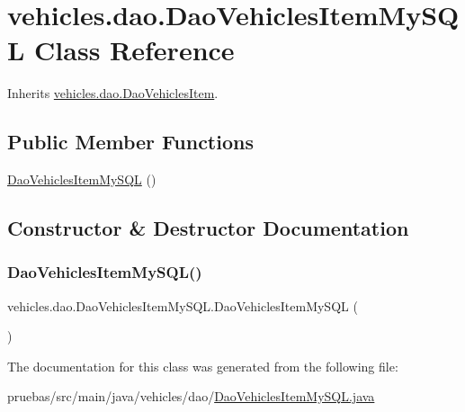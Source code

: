 \hypertarget{classvehicles_1_1dao_1_1_dao_vehicles_item_my_s_q_l}{}\section{vehicles.\+dao.\+Dao\+Vehicles\+Item\+My\+S\+QL Class Reference}
\label{classvehicles_1_1dao_1_1_dao_vehicles_item_my_s_q_l}


Inherits \mbox{\hyperlink{interfacevehicles_1_1dao_1_1_dao_vehicles_item}{vehicles.\+dao.\+Dao\+Vehicles\+Item}}.

\subsection*{Public Member Functions}
\begin{DoxyCompactItemize}
\item 
\mbox{\hyperlink{classvehicles_1_1dao_1_1_dao_vehicles_item_my_s_q_l_a07e117502b43cd48f8d14b644a675623}{Dao\+Vehicles\+Item\+My\+S\+QL}} ()
\end{DoxyCompactItemize}


\subsection{Constructor \& Destructor Documentation}
\mbox{\label{classvehicles_1_1dao_1_1_dao_vehicles_item_my_s_q_l_a07e117502b43cd48f8d14b644a675623}} 
\subsubsection{\texorpdfstring{Dao\+Vehicles\+Item\+My\+S\+Q\+L()}{DaoVehiclesItemMySQL()}}
{\footnotesize\ttfamily vehicles.\+dao.\+Dao\+Vehicles\+Item\+My\+S\+Q\+L.\+Dao\+Vehicles\+Item\+My\+S\+QL (\begin{DoxyParamCaption}{ }\end{DoxyParamCaption})}



The documentation for this class was generated from the following file\+:\begin{DoxyCompactItemize}
\item 
pruebas/src/main/java/vehicles/dao/\mbox{\hyperlink{_dao_vehicles_item_my_s_q_l_8java}{Dao\+Vehicles\+Item\+My\+S\+Q\+L.\+java}}\end{DoxyCompactItemize}
